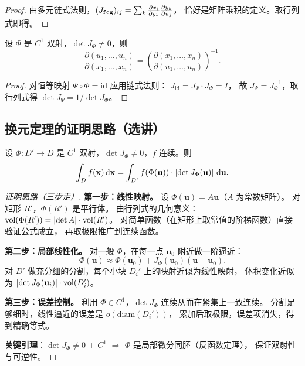 \documentclass{ctexart}
\DeclareMathOperator{\vol}{vol}
\begin{document}
\begin{proof}
  由多元链式法则，$(J_{\mathbf{f} \circ \mathbf{g}})_{ij}
  = \sum_k \frac{\partial x_i}{\partial y_k} \frac{\partial y_k}{\partial u_j}$，
  恰好是矩阵乘积的定义。取行列式即得。
\end{proof}

\begin{theorem}[逆映射的雅可比]
  设 $\Phi$ 是 $C^1$ 双射，$\det J_\Phi \ne 0$，则
  \[
    \frac{\partial(u_1,\ldots,u_n)}{\partial(x_1,\ldots,x_n)}
    = \left( \frac{\partial(x_1,\ldots,x_n)}{\partial(u_1,\ldots,u_n)} \right)^{-1}.
  \]
\end{theorem}

\begin{proof}
  对恒等映射 $\Psi \circ \Phi = \mathrm{id}$ 应用链式法则：
  $J_{\mathrm{id}} = J_\Psi \cdot J_\Phi = I$，
  故 $J_\Psi = J_\Phi^{-1}$，取行列式得 $\det J_\Psi = 1/\det J_\Phi$。
\end{proof}

\subsection{换元定理的证明思路（选讲）}

\begin{theorem}
  设 $\Phi: D' \to D$ 是 $C^1$ 双射，$\det J_\Phi \ne 0$，$f$ 连续。则
  \[
    \int_D f(\mathbf{x}) \,\mathrm{d} \mathbf{x}
    = \int_{D'} f(\Phi(\mathbf{u})) \cdot \left| \det J_\Phi(\mathbf{u}) \right| \,\mathrm{d} \mathbf{u}.
  \]
\end{theorem}

\begin{proof}[证明思路（三步走）]
  \textbf{第一步：线性映射。}
  设 $\Phi(\mathbf{u}) = A\mathbf{u}$（$A$ 为常数矩阵）。
  对矩形 $R'$，$\Phi(R')$ 是平行体。
  由行列式的几何意义：$\vol(\Phi(R')) = \abs{\det A} \cdot \vol(R')$。
  对简单函数（在矩形上取常值的阶梯函数）直接验证公式成立，
  再取极限推广到连续函数。

  \textbf{第二步：局部线性化。}
  对一般 $\Phi$，在每一点 $\mathbf{u}_0$ 附近做一阶逼近：
  \[
    \Phi(\mathbf{u}) \approx \Phi(\mathbf{u}_0) + J_\Phi(\mathbf{u}_0)(\mathbf{u} - \mathbf{u}_0).
  \]
  对 $D'$ 做充分细的分割，每个小块 $D_i'$ 上的映射近似为线性映射，
  体积变化近似为 $\abs{\det J_\Phi(\mathbf{u}_i)} \cdot \vol(D_i')$。

  \textbf{第三步：误差控制。}
  利用 $\Phi \in C^1$，$\det J_\Phi$ 连续从而在紧集上一致连续。
  分割足够细时，线性逼近的误差是 $o(\mathrm{diam}(D_i'))$，
  累加后取极限，误差项消失，得到精确等式。

  \textbf{关键引理}：$\det J_\Phi \ne 0$ + $C^1$
  $\Longrightarrow$ $\Phi$ 是局部微分同胚（反函数定理），
  保证双射性与可逆性。
\end{proof}
\end{document}
